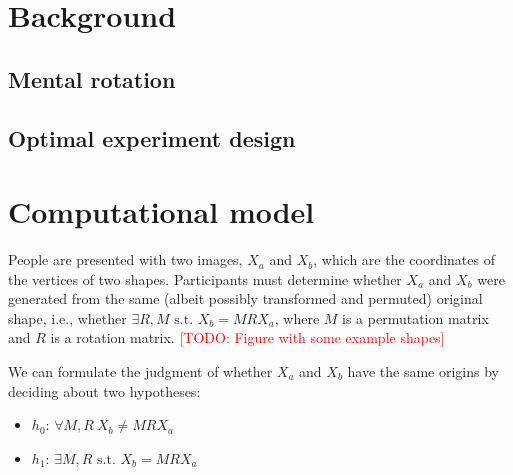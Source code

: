 \documentclass{article} %
\newcommand{\TODO}[1]{\textcolor{red}{[TODO: #1]}}
\begin{document}
\section{Background}

\subsection{Mental rotation}

\subsection{Optimal experiment design}


\section{Computational model}

People are presented with two images, $X_a$ and $X_b$, which are the
coordinates of the vertices of two shapes. Participants must determine
whether $X_a$ and $X_b$ were generated from the same (albeit possibly
transformed and permuted) original shape, i.e., whether $\exists
R,M\textrm{ s.t. } X_b=MRX_a$, where $M$ is a permutation matrix and
$R$ is a rotation matrix. \TODO{Figure with some example shapes}

We can formulate the judgment of whether $X_a$ and $X_b$ have the same
origins by deciding about two hypotheses:

\begin{itemize}
\itemsep1pt\parskip0pt
\item
  $h_0$: $\forall M,R\ X_b\neq MRX_a$
\item
  $h_1$: $\exists M,R\textrm{ s.t. } X_b=MRX_a$
\end{itemize}
\end{document}
